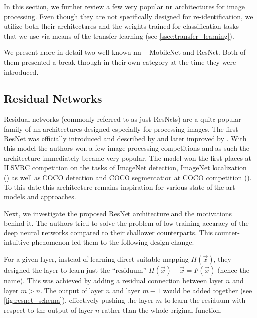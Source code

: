 \label{sec:existing_architectures}

In this section, we further review a few very popular \gls{nn} architectures for image processing. Even though they are not specifically designed for re-identification, we utilize both their architectures and the weights trained for classification tasks that we use via means of the transfer learning (see \autoref{ssec:transfer_learning}).

We present more in detail two well-known \gls{nn} -- MobileNet and ResNet. Both of them presented a break-through in their own category at the time they were introduced.

\subsection{Residual Networks}
\label{ssec:resnet}


Residual networks (commonly referred to as just ResNets) are a quite popular family of \gls{nn} architectures designed especially for processing images. The first ResNet was officially introduced and described by \cite{resnet} and later improved by \cite{resnetimp}. With this model the authors won a few image processing competitions and as such the architecture immediately became very popular. The model won the first places at ILSVRC competition on the tasks of ImageNet detection, ImageNet localization (\cite{imagenetresults}) as well as COCO detection and COCO segmentation at COCO competition (\cite{cocodataset}). To this date this architecture remains inspiration for various state-of-the-art models and approaches.

Next, we investigate the proposed ResNet architecture and the motivations behind it. The authors tried to solve the problem of low training accuracy of the deep neural networks compared to their shallower counterparts. This counter-intuitive phenomenon led them to the following design change.

For a given layer, instead of learning direct suitable mapping $H(\vec{x})$, they designed the layer to learn just the ``residuum'' $H(\vec{x}) - \vec{x} = F(\vec{x})$ (hence the name). This was achieved by adding a residual connection between layer $n$ and layer $m > n$. The output of layer $n$ and layer $m - 1$ would be added together (see \autoref{fig:resnet_schema}), effectively pushing the layer $m$ to learn the residuum with respect to the output of layer $n$ rather than the whole original function.

